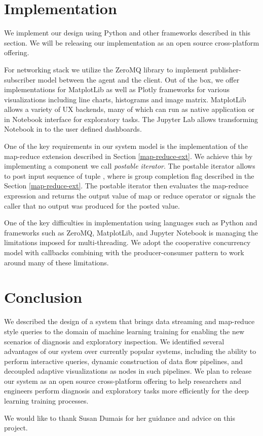 \documentclass[sigchi]{acmart}
\begin{document}
\section{Implementation}
We implement our design using Python and other frameworks described in this section. We will be releasing our implementation as an open source cross-platform offering.

For networking stack we utilize the ZeroMQ library to implement publisher-subscriber model between the agent and the client. Out of the box, we offer implementations for MatplotLib as well as Plotly frameworks for various visualizations including line charts, histograms and image matrix. MatplotLib allows a variety of UX backends, many of which can run as native application or in Notebook interface for exploratory tasks. The Jupyter Lab allows transforming Notebook in to the user defined dashboards.

One of the key requirements in our system model is the implementation of the map-reduce extension described in Section \ref{map-reduce-ext}. We achieve this by implementing a component we call \emph{postable iterator}. The postable iterator allows to post input sequence of tuple , where  is group completion flag described in the Section \ref{map-reduce-ext}. The postable iterator then evaluates the map-reduce expression and returns the output value of map or reduce operator or signals the caller that no output was produced for the posted value.

One of the key difficulties in implementation using languages such as Python and frameworks such as ZeroMQ, MatplotLib, and Jupyter Notebook is managing the limitations imposed for multi-threading. 
We adopt the cooperative concurrency model with callbacks combining with the producer-consumer pattern to work around many of these limitations. 













\section{Conclusion}
We described the design of a system that brings data streaming and map-reduce style queries to the domain of machine learning training for enabling the new scenarios of diagnosis and exploratory inspection. We identified several advantages of our system over currently popular systems, including the ability to perform interactive queries, dynamic construction of data flow pipelines, and decoupled adaptive visualizations as nodes in such pipelines. We plan to release our system as an open source cross-platform offering to help researchers and engineers perform diagnosis and exploratory tasks more efficiently for the deep learning training processes.

\begin{acks}
We would like to thank Susan Dumais for her guidance and advice on this project.
\end{acks}



\end{document}
